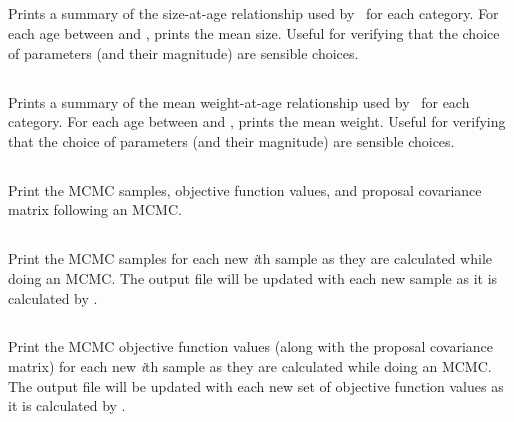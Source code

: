 \subsection{\label{sec:report-age-size}}

Prints a summary of the size-at-age relationship used by \SPM\ for each category. For each age between  and , prints the mean size. Useful for verifying that the choice of parameters (and their magnitude) are sensible choices.

\subsection{\label{sec:report-age-weight}}

Prints a summary of the mean weight-at-age relationship used by \SPM\ for each category. For each age between  and , prints the mean weight. Useful for verifying that the choice of parameters (and their magnitude) are sensible choices.

\subsection{}

Print the MCMC samples, objective function values, and proposal covariance matrix following an MCMC.

\subsection{}

Print the MCMC samples for each new \textit{i}th sample as they are calculated while doing an MCMC. The output file will be updated with each new sample as it is calculated by \SPM.

\subsection{}

Print the MCMC objective function values (along with the proposal covariance matrix) for each new \textit{i}th sample as they are calculated while doing an MCMC. The output file will be updated with each new set of objective function values as it is calculated by \SPM.
